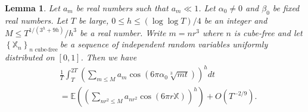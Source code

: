 \documentclass[10pt,leqno]{amsart}
\numberwithin{equation}{section}
\newtheorem{lemma}[definition]{{Lemma}}
\begin{document}
\begin{lemma}\label{le6.3}
     Let $a_m$ be real numbers such that $a_m \ll 1$. Let $\alpha_0 \neq 0$ and $\beta_0$ be fixed real numbers. Let $T$ be large, $0 \leqslant h \leqslant(\log \log T) / 4$ be an integer and $M \leqslant T^{1 /\left(3^h+9 h\right)} / h^3$ be a real number. Write $m=n r^3$ where $n$ is cube-free and let $\left\{\mathbb{X}_n\right\}_{n \text { cube-free  }}$be a sequence of independent random variables uniformly distributed on $[0,1]$. Then we have
     \[
     \begin{aligned}
     &\frac{1}{T} \int_T^{2 T}\left(\sum_{m \leqslant M} a_m \cos \left(6 \pi \alpha_0 \sqrt[3]{m t}\right)\right)^h d t\\
     &=  \mathbb{E}\left(\left(\sum_{n r^2 \leqslant M} a_{n r^2} \cos \left(6 \pi r \mathbb{X}\right)\right)^h\right) +O\left(T^{- 2/ 9}\right).
     \end{aligned}
     \]
\end{lemma}
\end{document}
